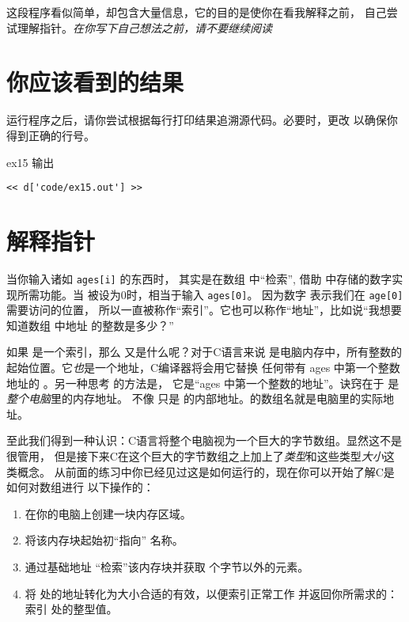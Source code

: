 这段程序看似简单，却包含大量信息，它的目的是使你在看我解释之前，
自己尝试理解指针。\emph{在你写下自己想法之前，请不要继续阅读}

\section{你应该看到的结果}

运行程序之后，请你尝试根据每行打印结果追溯源代码。必要时，更改
以确保你得到正确的行号。

\begin{code}{ex15 输出}
\begin{lstlisting}
<< d['code/ex15.out'] >>
\end{lstlisting}
\end{code}


\section{解释指针}

当你输入诸如 \verb|ages[i]| 的东西时， 其实是在数组  中“检索”,
借助  中存储的数字实现所需功能。当  被设为0时，相当于输入
\verb|ages[0]|。 因为数字  表示我们在 \verb|age[0]| 需要访问的位置，
所以一直被称作“索引”。它也可以称作“地址”，比如说“我想要知道数组 
中地址  的整数是多少？”

如果  是一个索引，那么  又是什么呢？对于C语言来说 
是电脑内存中，所有整数的起始位置。它\emph{也}是一个地址，C编译器将会用它替换
任何带有 ages 中第一个整数地址的 。另一种思考  的方法是，
它是“ages 中第一个整数的地址”。诀窍在于  是\emph{整个电脑}里的内存地址。
不像  只是  的内部地址。的数组名就是电脑里的实际地址。

至此我们得到一种认识：C语言将整个电脑视为一个巨大的字节数组。显然这不是很管用，
但是接下来C在这个巨大的字节数组之上加上了\emph{类型}和这些类型\emph{大小}这类概念。
从前面的练习中你已经见过这是如何运行的，现在你可以开始了解C是如何对数组进行
以下操作的：

\begin{enumerate}
\item 在你的电脑上创建一块内存区域。
\item 将该内存块起始初“指向”  名称。
\item 通过基础地址  “检索”该内存块并获取  个字节以外的元素。
\item 将  处的地址转化为大小合适的有效，以便索引正常工作
      并返回你所需求的：索引  处的整型值。
\end{enumerate}

